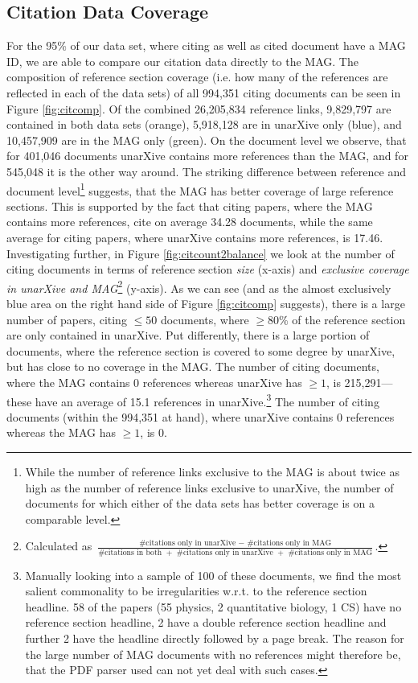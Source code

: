 \subsection{Citation Data Coverage}
For the 95\% of our data set, where citing as well as cited document have a MAG ID, we are able to compare our citation data directly to the MAG. The composition of reference section coverage (i.e. how many of the references are reflected in each of the data sets) of all 994,351 citing documents can be seen in Figure \ref{fig:citcomp}.  Of the combined 26,205,834 reference links, 9,829,797 are contained in both data sets (orange), 5,918,128 are in unarXive only (blue), and 10,457,909 are in the MAG only (green). On the document level we observe, that for 401,046 documents unarXive contains more references than the MAG, and for 545,048 it is the other way around. The striking difference between reference and document level\footnote{While the number of reference links exclusive to the MAG is about twice as high as the number of reference links exclusive to unarXive, the number of documents for which either of the data sets has better coverage is on a comparable level.} suggests, that the MAG has better coverage of large reference sections. This is supported by the fact that citing papers, where the MAG contains more references, cite on average 34.28 documents, while the same average for citing papers, where unarXive contains more references, is 17.46. Investigating further, in Figure \ref{fig:citcount2balance} we look at the number of citing documents in terms of reference section \emph{size} (x-axis) and \emph{exclusive coverage in unarXive and MAG}\footnote{Calculated as $\frac{\text{\#citations only in unarXive }-\text{ \#citations only in MAG}}{\text{\#citations in both }+\text{ \#citations only in unarXive }+\text{ \#citations only in MAG}}$.} (y-axis). As we can see (and as the almost exclusively blue area on the right hand side of Figure \ref{fig:citcomp} suggests), there is a large number of papers, citing $\leq 50$ documents, where $\geq 80\%$ of the reference section are only contained in unarXive. Put differently, there is a large portion of documents, where the reference section is covered to some degree by unarXive, but has close to no coverage in the MAG. The number of citing documents, where the MAG contains $0$ references whereas unarXive has $\ge 1$, is 215,291---these have an average of 15.1 references in unarXive.\footnote{Manually looking into a sample of 100 of these documents, we find the most salient commonality to be irregularities w.r.t. to the reference section headline. 58 of the papers (55 physics, 2 quantitative biology, 1 CS) have no reference section headline, 2 have a double reference section headline and further 2 have the headline directly followed by a page break. The reason for the large number of MAG documents with no references might therefore be, that the PDF parser used can not yet deal with such cases.} The number of citing documents (within the 994,351 at hand), where unarXive contains $0$ references whereas the MAG has $\ge 1$, is 0.

